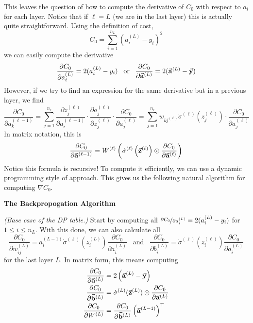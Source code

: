 This leaves the question of how to compute the derivative of $C_0$ with respect to $a_i$ for each layer. Notice that if $\ell = L$ (we 
are in the last layer) this is actually quite straightforward. Using the definition of cost,
\[
    C_0 = \sum_{i = 1}^{n_L} (a_i^{(L)} - y_i)^2
\]
we can easily compute the derivative
\[
    \frac{\partial C_0}{\partial a_i^{(L)}} = 2(a_i^{(L)} - y_i) \;\;\; \text{or} \;\;\; \frac{\partial C_0}{\partial \vec{\mathbf{a}}^{(L)}} = 2(\vec{\mathbf{a}}^{(L)} - \vec{\mathbf{y}})
\]
However, if we try to find an expression for the same derivative but in a previous layer, we find 
\[
    \frac{\partial C_0}{\partial a_k^{(\ell - 1)}} = \sum_{j = 1}^{n_\ell} \frac{\partial z_j^{(\ell)}}{\partial a_i^{(\ell - 1)}} \cdot 
                                                                             \frac{\partial a_j^{(\ell)}}{\partial z_j^{(\ell)}} \cdot 
                                                                             \frac{\partial C_0}{\partial a_j^{(\ell)}}
                                                   = \sum_{j = 1}^{n_\ell}  w_{kj^{(\ell)}} \dot\sigma^{(\ell)}(z_j^{(\ell)}) \cdot \frac{\partial C_0}{\partial a_j^{(\ell)}}
\]
In matrix notation, this is 
\[
    \frac{\partial C_0}{\partial \vec{\mathbf{a}}^{(\ell - 1)}} = W^{(\ell)} \left(\dot\sigma^{(\ell)}\left(\vec{\mathbf{z}}^{(\ell)}\right) \odot \frac{\partial C_0}{\partial \vec{\mathbf{a}}^{(\ell)}}\right)
\]
Notice this formula is recursive! To compute it efficiently, we can use a dynamic programming style of approach. This 
gives us the following natural algorithm for computing $\nabla C_0$.

\begin{center}
    \textbf{The Backpropogation Algorithm}
\end{center}

\emph{(Base case of the DP table.)} Start by computing all $\nicefrac{\partial C_0}{\partial a_i^{(L)}} = 2(a_i^{(L)} - y_i)$ for $1 \leq i \leq n_L$.
With this done, we can also calculate all 
\[
    \frac{\partial C_0}{\partial w_{ij}^{(L)}} = a_i^{(L - 1)} \dot\sigma^{(\ell)}(z_i^{(L)}) \frac{\partial C_0}{\partial a_i^{(L)}} \;\;\; \text{and} \;\;\; \frac{\partial C_0}{\partial b_i^{(L)}} = \dot\sigma^{(\ell)}(z_i^{(\ell)}) \frac{\partial C_0}{\partial a_i^{(L)}}
\]
for the last layer $L$. In matrix form, this means computing 
\begin{align*}
    \frac{\partial C_0}{\partial \vec{\mathbf{a}}^{(L)}} &= 2\left(\vec{\mathbf{a}}^{(L)} - \vec{\mathbf{y}}\right) \\
    \frac{\partial C_0}{\partial \vec{\mathbf{b}}^{(L)}} &= \dot\sigma^{(L)}(\vec{\mathbf{z}}^{(L)}) \odot \frac{\partial C_0}{\partial \vec{\mathbf{a}}^{(L)}} \\
    \frac{\partial C_0}{\partial W^{(L)}}        &= \frac{\partial C_0}{\partial \vec{\mathbf{b}}^{(L)}} \left(\vec{\mathbf{a}}^{(L - 1)}\right)^\top
\end{align*}

